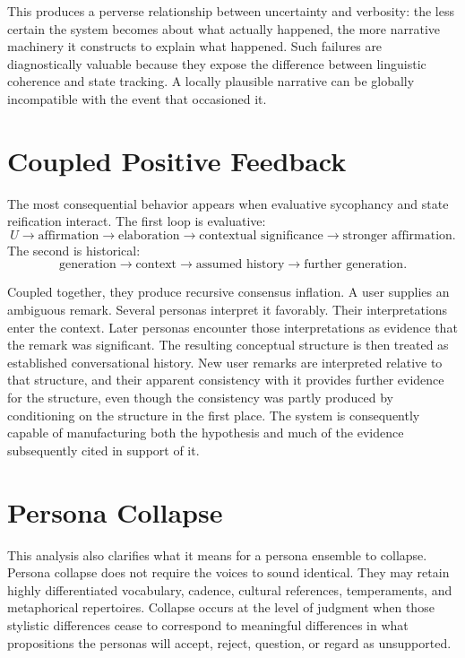 This produces a perverse relationship between uncertainty and verbosity: the less certain the system becomes about what actually happened, the more narrative machinery it constructs to explain what happened. Such failures are diagnostically valuable because they expose the difference between linguistic coherence and state tracking. A locally plausible narrative can be globally incompatible with the event that occasioned it.

\section{Coupled Positive Feedback}

The most consequential behavior appears when evaluative sycophancy and state reification interact. The first loop is evaluative:
\[
U \to \text{affirmation} \to \text{elaboration} \to \text{contextual significance} \to \text{stronger affirmation}.
\]
The second is historical:
\[
\text{generation} \to \text{context} \to \text{assumed history} \to \text{further generation}.
\]

Coupled together, they produce recursive consensus inflation. A user supplies an ambiguous remark. Several personas interpret it favorably. Their interpretations enter the context. Later personas encounter those interpretations as evidence that the remark was significant. The resulting conceptual structure is then treated as established conversational history. New user remarks are interpreted relative to that structure, and their apparent consistency with it provides further evidence for the structure, even though the consistency was partly produced by conditioning on the structure in the first place. The system is consequently capable of manufacturing both the hypothesis and much of the evidence subsequently cited in support of it.

\section{Persona Collapse}

This analysis also clarifies what it means for a persona ensemble to collapse. Persona collapse does not require the voices to sound identical. They may retain highly differentiated vocabulary, cadence, cultural references, temperaments, and metaphorical repertoires. Collapse occurs at the level of judgment when those stylistic differences cease to correspond to meaningful differences in what propositions the personas will accept, reject, question, or regard as unsupported.

